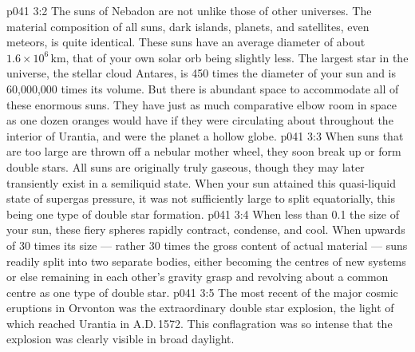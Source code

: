 \vs p041 3:2 The suns of Nebadon are not unlike those of other universes. The material composition of all suns, dark islands, planets, and satellites, even meteors, is quite identical. These suns have an average diameter of about $1.6\times 10^6$\,km, that of your own solar orb being slightly less. The largest star in the universe, the stellar cloud Antares, is 450 times the diameter of your sun and is 60,000,000 times its volume. But there is abundant space to accommodate all of these enormous suns. They have just as much comparative elbow room in space as one dozen oranges would have if they were circulating about throughout the interior of Urantia, and were the planet a hollow globe.
\vs p041 3:3 \pc When suns that are too large are thrown off a nebular mother wheel, they soon break up or form double stars. All suns are originally truly gaseous, though they may later transiently exist in a semiliquid state. When your sun attained this quasi\hyp{}liquid state of supergas pressure, it was not sufficiently large to split equatorially, this being one type of double star formation.
\vs p041 3:4 When less than 0.1 the size of your sun, these fiery spheres rapidly contract, condense, and cool. When upwards of 30 times its size --- rather 30 times the gross content of actual material --- suns readily split into two separate bodies, either becoming the centres of new systems or else remaining in each other’s gravity grasp and revolving about a common centre as one type of double star.
\vs p041 3:5 \pc The most recent of the major cosmic eruptions in Orvonton was the extraordinary double star explosion, the light of which reached Urantia in A.D.\,1572. This conflagration was so intense that the explosion was clearly visible in broad daylight.

